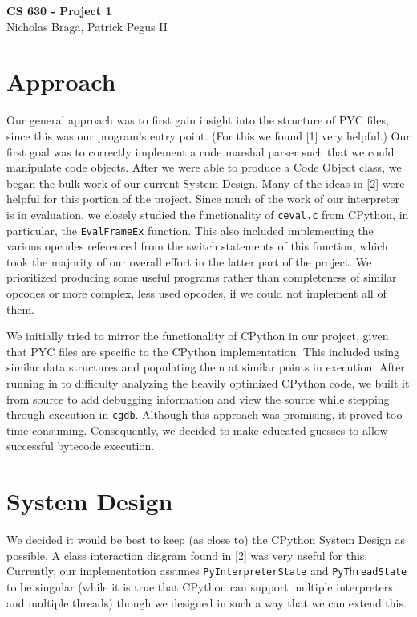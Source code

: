 \documentclass{article}
\begin{document}
\begin{center}
{\LARGE \bf CS 630 - Project 1}\\
\vspace*{0.1cm}
{\normalsize Nicholas Braga, Patrick Pegus II}
\end{center}

\section*{Approach}

Our general approach was to first gain insight into the structure of PYC files, since this was our program's entry point. (For this we found [1] very helpful.) Our first goal was to correctly implement a code marshal parser such that we could manipulate code objects. After we were able to produce a Code Object class, we began the bulk work of our current System Design. Many of the ideas in [2] were helpful for this portion of the project. Since much of the work of our interpreter is in evaluation, we closely studied the functionality of \texttt{ceval.c} from CPython, in particular, the \texttt{EvalFrameEx} function.
This also included implementing the various opcodes referenced from the switch statements of this function, which took the majority of our overall effort in the latter part of the project. We prioritized producing some useful programs rather than completeness of similar opcodes or more complex, less used opcodes, if we could not implement all of them.

We initially tried to mirror the functionality of CPython in our project, given that PYC files are specific to the CPython implementation. This included using similar data structures and populating
them at similar points in execution. After running in to difficulty analyzing the heavily optimized CPython code, we built it from source to add debugging information and view the source while stepping through execution
in \texttt{cgdb}. Although this approach was promising, it proved too time consuming. Consequently, we decided to make educated guesses to allow successful bytecode execution.

\section*{System Design}

We decided it would be best to keep (as close to) the CPython System Design as possible. A class interaction diagram found in [2] was very useful for this. Currently, our implementation assumes \texttt{PyInterpreterState} and \texttt{PyThreadState} to be singular (while it is true that CPython can support multiple interpreters and multiple threads) though we designed in such a way that we can extend this. 
\end{document}
